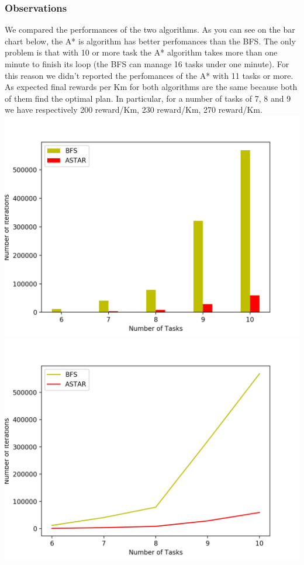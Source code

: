\documentclass[11pt]{article}
\begin{document}
\subsubsection{Observations}
We compared the performances of the two algorithms. As you can see on the bar chart below, the A* is algorithm has better perfomances than the BFS. The only problem is that with 10 or more task the A* algorithm takes more than one minute to finish its loop (the BFS can manage 16 tasks under one minute). For this reason we didn't reported the perfomances of the A* with 11 tasks or more. As expected final rewards per Km for both algorithms are the same because both of them find the optimal plan. In particular, for a number of tasks of 7, 8 and 9 we have respectively 200 reward/Km, 230 reward/Km, 270 reward/Km.\\
\includegraphics[scale=0.5]{bar.png}
\includegraphics[scale=0.5]{plot.png}
\end{document}
